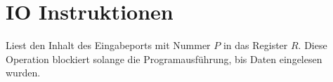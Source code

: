 \section{IO Instruktionen}
\label{sec:IO-Instruktionen}




Liest den Inhalt des Eingabeports mit Nummer $P$ in das Register $R$.
Diese Operation blockiert solange die Programausführung, bis Daten eingelesen
wurden.








